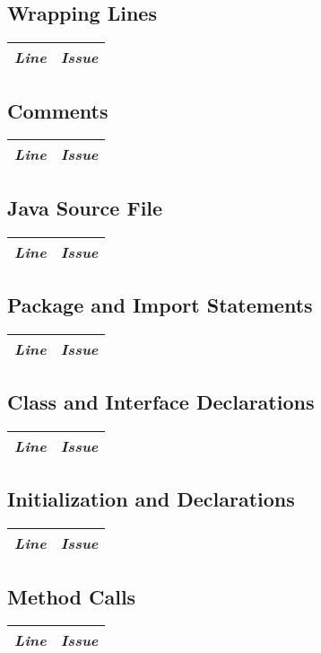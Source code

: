 \documentclass[11pt,a4paper]{report}
\begin{document}
\subsection{Wrapping Lines}
\begin{tabularx}{\textwidth}{|l|X|}
	\hline
	\textit{Line} & \textit{Issue}\\
	\hline
\end{tabularx}
\subsection{Comments}
\begin{tabularx}{\textwidth}{|l|X|}
	\hline
	\textit{Line} & \textit{Issue}\\
	\hline
\end{tabularx}
\subsection{Java Source File}
\begin{tabularx}{\textwidth}{|l|X|}
	\hline
	\textit{Line} & \textit{Issue}\\
	\hline
\end{tabularx}
\subsection{Package and Import Statements}
\begin{tabularx}{\textwidth}{|l|X|}
	\hline
	\textit{Line} & \textit{Issue}\\
	\hline
\end{tabularx}
\subsection{Class and Interface Declarations}
\begin{tabularx}{\textwidth}{|l|X|}
	\hline
	\textit{Line} & \textit{Issue}\\
	\hline
\end{tabularx}
\subsection{Initialization and Declarations}
\begin{tabularx}{\textwidth}{|l|X|}
	\hline
	\textit{Line} & \textit{Issue}\\
	\hline
\end{tabularx}
\subsection{Method Calls}
\begin{tabularx}{\textwidth}{|l|X|}
	\hline
	\textit{Line} & \textit{Issue}\\
	\hline
\end{tabularx}
\end{document}
